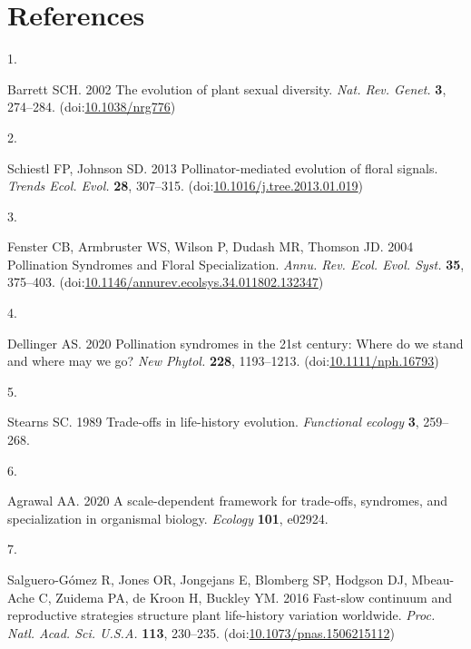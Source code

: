 \documentclass[
  12pt,
  a4paper,
]{article}
\newlength{\cslhangindent}
\newlength{\csllabelwidth}
\newlength{\cslentryspacingunit} %
\newenvironment{CSLReferences}[2] %
 {%
  \setlength{\parindent}{0pt}
  \ifodd #1
  \let\oldpar\par
  \def\par{\hangindent=\cslhangindent\oldpar}
  \fi
  \setlength{\parskip}{#2\cslentryspacingunit}
 }%
 {}
\newcommand{\CSLLeftMargin}[1]{\parbox[t]{\csllabelwidth}{#1}}
\newcommand{\CSLRightInline}[1]{\parbox[t]{\linewidth - \csllabelwidth}{#1}\break}
\begin{document}
\hypertarget{references}{%
\section{References}\label{references}}

\hypertarget{refs}{}
\begin{CSLReferences}{0}{0}
\leavevmode{}%
\CSLLeftMargin{1. }
\CSLRightInline{Barrett SCH. 2002 The evolution of plant sexual diversity. \emph{Nat. Rev. Genet.} \textbf{3}, 274--284. (doi:\href{https://doi.org/10.1038/nrg776}{10.1038/nrg776})}

\leavevmode{}%
\CSLLeftMargin{2. }
\CSLRightInline{Schiestl FP, Johnson SD. 2013 Pollinator-mediated evolution of floral signals. \emph{Trends Ecol. Evol.} \textbf{28}, 307--315. (doi:\href{https://doi.org/10.1016/j.tree.2013.01.019}{10.1016/j.tree.2013.01.019})}

\leavevmode{}%
\CSLLeftMargin{3. }
\CSLRightInline{Fenster CB, Armbruster WS, Wilson P, Dudash MR, Thomson JD. 2004 Pollination {Syndromes} and {Floral Specialization}. \emph{Annu. Rev. Ecol. Evol. Syst.} \textbf{35}, 375--403. (doi:\href{https://doi.org/10.1146/annurev.ecolsys.34.011802.132347}{10.1146/annurev.ecolsys.34.011802.132347})}

\leavevmode{}%
\CSLLeftMargin{4. }
\CSLRightInline{Dellinger AS. 2020 Pollination syndromes in the 21st century: Where do we stand and where may we go? \emph{New Phytol.} \textbf{228}, 1193--1213. (doi:\href{https://doi.org/10.1111/nph.16793}{10.1111/nph.16793})}

\leavevmode{}%
\CSLLeftMargin{5. }
\CSLRightInline{Stearns SC. 1989 Trade-offs in life-history evolution. \emph{Functional ecology} \textbf{3}, 259--268.}

\leavevmode{}%
\CSLLeftMargin{6. }
\CSLRightInline{Agrawal AA. 2020 A scale-dependent framework for trade-offs, syndromes, and specialization in organismal biology. \emph{Ecology} \textbf{101}, e02924.}

\leavevmode{}%
\CSLLeftMargin{7. }
\CSLRightInline{Salguero-Gómez R, Jones OR, Jongejans E, Blomberg SP, Hodgson DJ, Mbeau-Ache C, Zuidema PA, de Kroon H, Buckley YM. 2016 Fast-slow continuum and reproductive strategies structure plant life-history variation worldwide. \emph{Proc. Natl. Acad. Sci. U.S.A.} \textbf{113}, 230--235. (doi:\href{https://doi.org/10.1073/pnas.1506215112}{10.1073/pnas.1506215112})}


\end{CSLReferences}
\end{document}
